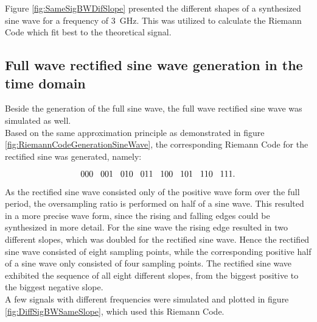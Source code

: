 Figure \ref{fig:SameSigBWDifSlope} presented the different shapes of a synthesized sine wave for a frequency of \SI{3}{\GHz}.
This was utilized to calculate the Riemann Code which fit best to the theoretical signal.


\subsection{Full wave rectified sine wave generation in the time domain}
Beside the generation of the full sine wave, the full wave rectified sine wave was simulated as well.\\
Based on the same approximation principle as demonstrated in figure \ref{fig:RiemannCodeGenerationSineWave}, the corresponding Riemann Code for the rectified sine was generated, namely:



\begin{equation}
 000\hspace{.3cm} 001\hspace{.3cm} 010\hspace{.3cm} 011\hspace{.3cm} 100\hspace{.3cm} 101\hspace{.3cm} 110\hspace{.3cm} 111.
\end{equation}
\label{eq:RiemannCodeRectSine}

As the rectified sine wave consisted only of the positive wave form over the full period, the oversampling ratio is performed on half of a sine wave.
This resulted in a more precise wave form, since the rising and falling edges could be synthesized in more detail.
For the sine wave the rising edge resulted in two different slopes, which was doubled for the rectified sine wave.
Hence the rectified sine wave consisted of eight sampling points, while the corresponding positive half of a sine wave only consisted of four sampling points.
The rectified sine wave exhibited the sequence of all eight different slopes, from the biggest positive to the biggest negative slope.\\
A few signals with different frequencies were simulated and plotted in figure \ref{fig:DiffSigBWSameSlope}, which used this Riemann Code.

